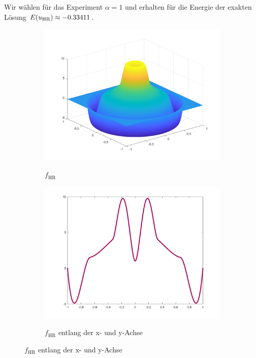 Wir wählen für das Experiment $\alpha=1$ und erhalten für die Energie 
der exakten Lösung $E(u_\textup{HR})\approx -0.33411$.
\begin{figure}[p]
  \centering
  \begin{subfigure}[b]{.38\linewidth}
    \centering
    \caption{$f_\textrm{HR}$}
    \includegraphics[trim = 40 30 30 30, clip, width=\linewidth]
      {pictures/chapExperiments/secExactSol/f04/inSi.png}
    \label{fig:f04InSi}
  \end{subfigure}
  \quad
  \begin{subfigure}[b]{.38\linewidth}
    \centering
    \caption{$f_\textrm{HR}$ entlang der x- und y-Achse}
    \includegraphics[trim = 50 30 50 20, clip, width=\linewidth]
      {pictures/chapExperiments/secExactSol/f04/inSiAxis.png}
    \label{fig:f04InSiAxis}
  \end{subfigure}


\end{figure}
